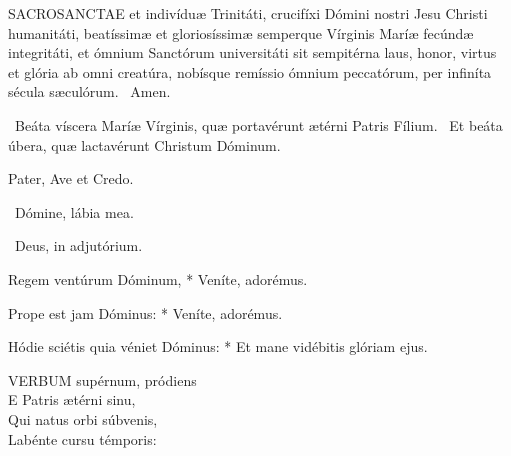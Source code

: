 
\lettrine[lines=2]{S}{ACROSANCTAE} et indivíduæ Trinitáti, crucifíxi Dómini nostri Jesu Christi humanitáti, beatíssimæ et gloriosíssimæ semperque Vírginis Maríæ fecúndæ integritáti, et ómnium Sanctórum universitáti sit sempitérna laus, honor, virtus et glória ab omni creatúra, nobísque remíssio ómnium peccatórum, per infiníta sécula sæculórum. \R\ Amen.

\V\ Beáta víscera Maríæ Vírginis, quæ portavérunt ætérni Patris Fílium. \R\ Et beáta úbera, quæ lactavérunt Christum Dóminum.







Pater, Ave et Credo.

\V\ Dómine, lábia mea.

\V\ Deus, in adjutórium.



 Regem ventúrum Dóminum, * Veníte, adorémus.


 Prope est jam Dóminus: * Veníte, adorémus.


 Hódie sciétis quia véniet Dóminus: * Et mane vidébitis glóriam ejus.


\lettrine[lines=2]{V}{ERBUM} supérnum, pródiens\\
E Patris ætérni sinu,\\
Qui natus orbi súbvenis,\\
Labénte cursu témporis:

